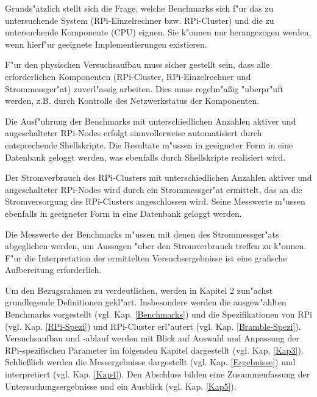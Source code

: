Grunds"atzlich stellt sich die Frage, welche Benchmarks sich f"ur das zu untersuchende System (RPi-Einzelrechner bzw. RPi-Cluster) und die zu untersuchende Komponente (CPU) eignen. Sie k"onnen nur herangezogen werden, wenn hierf"ur geeignete Implementierungen existieren. 

F"ur den physischen Versuchsaufbau muss sicher gestellt sein, dass alle erforderlichen Komponenten (RPi-Cluster, RPi-Einzelrechner und Strommessger"at) zuverl"assig arbeiten. Dies muss regelm"a\ss ig "uberpr"uft werden, z.B. durch Kontrolle des Netzwerkstatus der Komponenten.  

Die Ausf"uhrung der Benchmarks mit unterschiedlichen Anzahlen aktiver und angeschalteter RPi-Nodes erfolgt sinnvollerweise automatisiert durch entsprechende Shellskripte. Die Resultate m"ussen in geeigneter Form in eine Datenbank geloggt werden, was ebenfalls durch Shellskripte realisiert wird. 

Der Stromverbrauch des RPi-Clusters mit unterschiedlichen Anzahlen aktiver und angeschalteter RPi-Nodes wird durch ein Strommessger"at ermittelt, das an die Stromversorgung des RPi-Clusters angeschlossen wird. Seine Messwerte m"ussen ebenfalls in geeigneter Form in eine Datenbank geloggt werden.  

\noindent
Die Messwerte der Benchmarks m"ussen mit denen des Strommessger"ats abgeglichen werden, um Aussagen "uber den Stromverbrauch treffen zu k"onnen. F"ur die Interpretation der ermittelten Versuchsergebnisse ist eine grafische Aufbereitung erforderlich.

Um den Bezugsrahmen zu verdeutlichen, werden in Kapitel 2 zun"achst grundlegende Definitionen gekl"art. Insbesondere werden die ausgew"ahlten Benchmarks vorgestellt (vgl. Kap. \ref{Benchmarks}) und die Spezifikationen von RPi (vgl. Kap. \ref{RPi-Spezi}) und RPi-Cluster erl"autert (vgl. Kap. \ref{Bramble-Spezi}). Versuchsaufbau und -ablauf werden mit Blick auf Auswahl und Anpassung der RPi-spezifischen Parameter im folgenden Kapitel dargestellt (vgl. Kap. \ref{Kap3}). Schlie\ss lich  werden die Messergebnisse dargestellt (vgl. Kap. \ref{Ergebnisse}) und interpretiert (vgl. Kap. \ref{Kap4}). Den Abschluss bilden eine Zusammenfassung der Untersuchungsergebnisse und ein Ausblick (vgl. Kap. \ref{Kap5}).

\endinput 
